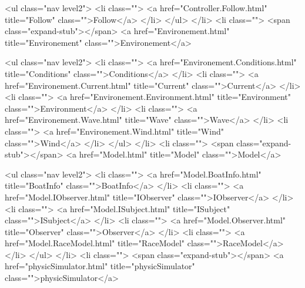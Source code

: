                         <ul class="nav level2">
                          <li class="">
                            <a href="Controller.Follow.html" title="Follow" class="">Follow</a>
                          </li>
                        </ul>  </li>
                    <li class="">
                      <span class="expand-stub"></span>
                      <a href="Environement.html" title="Environement" class="">Environement</a>
                        
                        <ul class="nav level2">
                          <li class="">
                            <a href="Environement.Conditions.html" title="Conditions" class="">Conditions</a>
                          </li>
                          <li class="">
                            <a href="Environement.Current.html" title="Current" class="">Current</a>
                          </li>
                          <li class="">
                            <a href="Environement.Environment.html" title="Environment" class="">Environment</a>
                          </li>
                          <li class="">
                            <a href="Environement.Wave.html" title="Wave" class="">Wave</a>
                          </li>
                          <li class="">
                            <a href="Environement.Wind.html" title="Wind" class="">Wind</a>
                          </li>
                        </ul>  </li>
                    <li class="">
                      <span class="expand-stub"></span>
                      <a href="Model.html" title="Model" class="">Model</a>
                        
                        <ul class="nav level2">
                          <li class="">
                            <a href="Model.BoatInfo.html" title="BoatInfo" class="">BoatInfo</a>
                          </li>
                          <li class="">
                            <a href="Model.IObserver.html" title="IObserver" class="">IObserver</a>
                          </li>
                          <li class="">
                            <a href="Model.ISubject.html" title="ISubject" class="">ISubject</a>
                          </li>
                          <li class="">
                            <a href="Model.Observer.html" title="Observer" class="">Observer</a>
                          </li>
                          <li class="">
                            <a href="Model.RaceModel.html" title="RaceModel" class="">RaceModel</a>
                          </li>
                        </ul>  </li>
                    <li class="">
                      <span class="expand-stub"></span>
                      <a href="physicSimulator.html" title="physicSimulator" class="">physicSimulator</a>
                        
